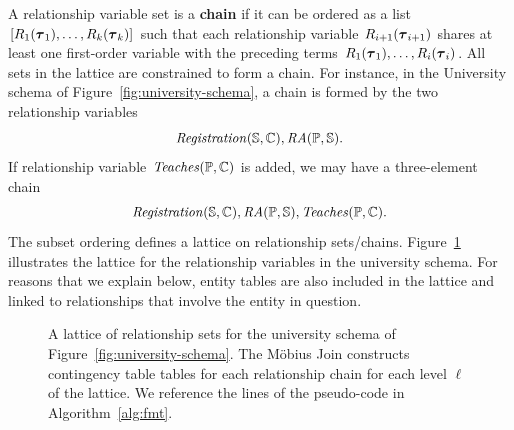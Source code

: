 \documentclass{sig-alternate-2013}
\begin{document}
A relationship variable set is a \textbf{chain} if it can be ordered as a list $[R_{1}(\boldsymbol{\tau}_{1}),\ldots,R_{k}(\boldsymbol{\tau}_{k})]$ 
such that each relationship variable $R_{i+1}(\boldsymbol{\tau}_{i+1})$ shares at least one first-order variable with the preceding terms $R_{1}(\boldsymbol{\tau}_{1}),\ldots,R_{i}(\boldsymbol{\tau}_{i})$.
All sets in the lattice are constrained to form a chain.
%
For instance, in the University schema of Figure~\ref{fig:university-schema}, a %
chain is formed by the two relationship variables
\[\mathit{Registration}(\mathbb{S},\mathbb{C}),\mathit{RA}(\mathbb{P},\mathbb{S}).\]
If relationship variable $\it{Teaches}(\mathbb{P},\mathbb{C})$ is added,
we may have a three-element chain \[\mathit{Registration}(\mathbb{S},\mathbb{C}),\mathit{RA}(\mathbb{P},\mathbb{S}),\it{Teaches}(\mathbb{P},\mathbb{C}).\] 
The subset ordering defines a lattice on relationship sets/chains. 
Figure~\ref{fig:big-lattice} illustrates the  lattice for the relationship variables in the university schema. 
For reasons that we explain below, entity tables are also included in the lattice and linked to relationships that involve the entity in question. 
\begin{figure}[htbp]
\begin{center}

\caption{A lattice of relationship sets for the university schema of Figure~\ref{fig:university-schema}. The M\"obius Join constructs contingency table tables for each relationship chain for each level $\ell$ of the lattice. We reference the lines of the pseudo-code in Algorithm~\ref{alg:fmt}.
\label{fig:big-lattice}}
\end{center}
\end{figure}
\end{document}

